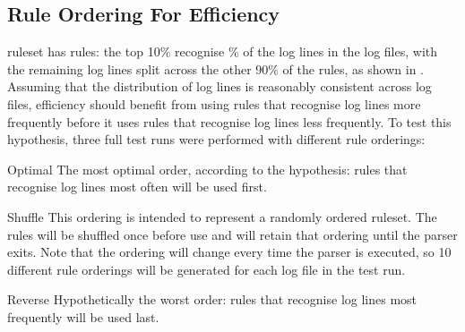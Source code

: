 

\FloatBarrier{}

\subsection{Rule Ordering For Efficiency}

\label{rule ordering for efficiency}

\parsernames{} ruleset has \numberOFrules{} rules: the top 10\% recognise
\% of the log lines in the
\numberOFlogFILES{} log files, with the remaining log lines split across
the other 90\% of the rules, as shown in .
Assuming that the distribution of log lines is reasonably consistent across
log files, \parsernames{} efficiency should benefit from using rules that
recognise log lines more frequently before it uses rules that recognise log
lines less frequently.  To test this hypothesis, three full test runs were
performed with different rule orderings:

\begin{boldeqlist}

    \item [Optimal]  The most optimal order, according to the hypothesis:
        rules that recognise log lines most often will be used first.

    \item [Shuffle] This ordering is intended to represent a randomly
        ordered ruleset.  The rules will be shuffled once before use and
        will retain that ordering until the parser exits.  Note that the
        ordering will change every time the parser is executed, so 10
        different rule orderings will be generated for each log file in the
        test run.

    \item [Reverse] Hypothetically the worst order: rules that recognise
        log lines most frequently will be used last.

\end{boldeqlist}

